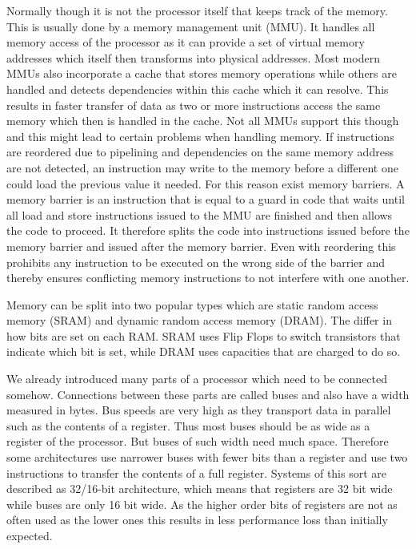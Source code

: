 Normally though it is not the processor itself that keeps track of the memory.
This is usually done by a memory management unit (MMU).
It handles all memory access of the processor as it can provide a set of virtual memory addresses which itself then transforms into physical addresses.
Most modern MMUs also incorporate a cache that stores memory operations while others are handled and detects dependencies within this cache which it can resolve.
This results in faster transfer of data as two or more instructions access the same memory which then is handled in the cache.
Not all MMUs support this though and this might lead to certain problems when handling memory.
If instructions are reordered due to pipelining and dependencies on the same memory address are not detected, an instruction may write to the memory before a different one could load the previous value it needed.
For this reason exist memory barriers.
A memory barrier is an instruction that is equal to a guard in code that waits until all load and store instructions issued to the MMU are finished and then allows the code to proceed.
It therefore splits the code into instructions issued before the memory barrier and issued after the memory barrier.
Even with reordering this prohibits any instruction to be executed on the wrong side of the barrier and thereby ensures conflicting memory instructions to not interfere with one another.

Memory can be split into two popular types which are static random access memory (SRAM) and dynamic random access memory (DRAM).
The differ in how bits are set on each RAM.
SRAM uses Flip Flops to switch transistors that indicate which bit is set, while DRAM uses capacities that are charged to do so.

We already introduced many parts of a processor which need to be connected somehow.
Connections between these parts are called buses and also have a width measured in bytes.
Bus speeds are very high as they transport data in parallel such as the contents of a register.
Thus most buses should be as wide as a register of the processor.
But buses of such width need much space.
Therefore some architectures use narrower buses with fewer bits than a register and use two instructions to transfer the contents of a full register.
Systems of this sort are described as 32/16-bit architecture, which means that registers are 32 bit wide while buses are only 16 bit wide.
As the higher order bits of registers are not as often used as the lower ones this results in less performance loss than initially expected.


